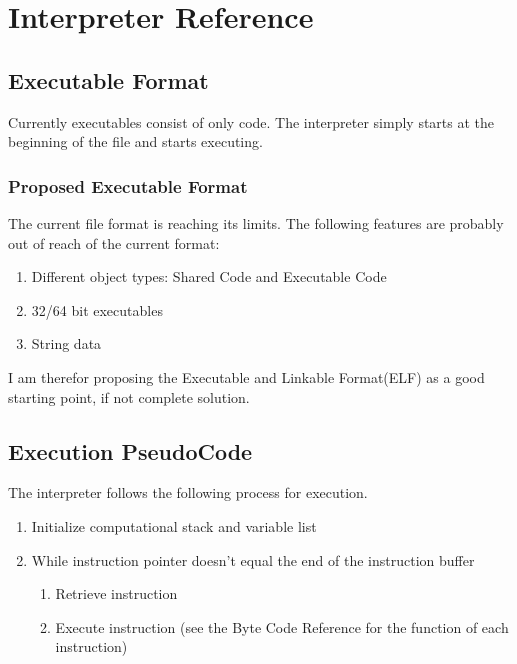 \documentclass{standalone}
\begin{document}
\chapter{Interpreter Reference}
	\section{Executable Format}
		Currently executables consist of only code. The interpreter simply starts at the beginning of the file and starts executing.

		\subsection{Proposed Executable Format}
			The current file format is reaching its limits. The following features are probably out of reach of the current format:
			\begin{enumerate}
				\item Different object types: Shared Code and Executable Code
				\item 32/64 bit executables
				\item String data
			\end{enumerate}
			I am therefor proposing the Executable and Linkable Format(ELF) as a good starting point, if not complete solution.

	\section{Execution PseudoCode}
		The interpreter follows the following process for execution.
		\begin{enumerate}
			\item Initialize computational stack and variable list 
			\item While instruction pointer doesn't equal the end of the instruction buffer
				\begin{enumerate}
					\item Retrieve instruction
					\item Execute instruction (see the Byte Code Reference for the function of each instruction)
				\end{enumerate}
		\end{enumerate}
\end{document}
